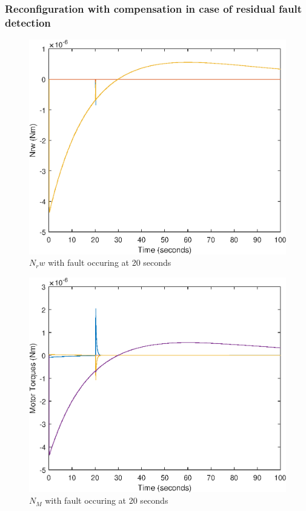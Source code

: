 
\subsubsection{Reconfiguration with compensation in case of residual fault detection}

\begin{figure}
	\centering
	\includegraphics[width=120mm]{figures/3dTorque_resid_reconfig}
	\caption{$N_rw$ with fault occuring at 20 seconds}
\end{figure} 

\begin{figure}
	\centering
	\includegraphics[width=120mm]{figures/torque_reconfig}
	\caption{$N_M$ with fault occuring at 20 seconds}
\end{figure} 


